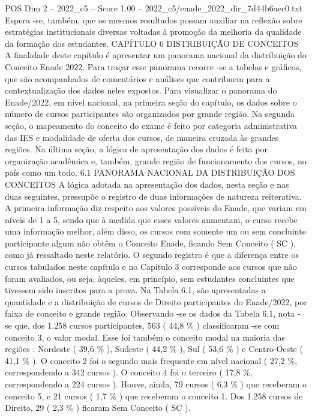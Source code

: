 \begin{textsample}{POS Dim 2 – 2022\_c5 – Score 1.00 – 2022\_c5/enade\_2022\_dir\_7d44b6aec0.txt}
Espera -se, também, que os mesmos resultados possam auxiliar na reflexão sobre estratégias institucionais diversas voltadas à promoção da melhoria da qualidade da formação dos estudantes.
CAPÍTULO 6 DISTRIBUIÇÃO DE CONCEITOS A finalidade deste capítulo é apresentar um panorama nacional da distribuição do Conceito Enade 2022.
Para traçar esse panorama recorre -se a tabelas e gráficos, que são acompanhados de comentários e análises que contribuem para a contextualização dos dados neles expostos.
Para visualizar o panorama do Enade/2022, em nível nacional, na primeira seção do capítulo, os dados sobre o número de cursos participantes são organizados por grande região.
Na segunda seção, o mapeamento do conceito do exame é feito por categoria administrativa das IES e modalidade de oferta dos cursos, de maneira cruzada às grandes regiões.
Na última seção, a lógica de apresentação dos dados é feita por organização acadêmica e, também, grande região de funcionamento dos cursos, no país como um todo. 6.1 PANORAMA NACIONAL DA DISTRIBUIÇÃO DOS CONCEITOS A lógica adotada na apresentação dos dados, nesta seção e nas duas seguintes, pressupõe o registro de duas informações de natureza reiterativa.
A primeira informação diz respeito aos valores possíveis do Enade, que variam em níveis de 1 a 5, sendo que à medida que esses valores aumentam, o curso recebe uma informação melhor, além disso, os cursos com somente um ou sem concluinte participante algum não obtêm o Conceito Enade, ficando Sem Conceito ( SC ), como já ressaltado neste relatório.
O segundo registro é que a diferença entre os cursos tabulados neste capítulo e no Capítulo 3 corresponde aos cursos que não foram avaliados, ou seja, àqueles, em princípio, sem estudantes concluintes que tivessem sido inscritos para a prova.
Na Tabela 6.1, são apresentadas a quantidade e a distribuição de cursos de Direito participantes do Enade/2022, por faixa de conceito e grande região.
Observando -se os dados da Tabela 6.1, nota -se que, dos 1.258 cursos participantes, 563 ( 44,8 \% ) classificaram -se com conceito 3, o valor modal.
Esse foi também o conceito modal na maioria das regiões : Nordeste ( 39,6 \% ), Sudeste ( 44,2 \% ), Sul ( 53,6 \% ) e Centro-Oeste ( 41,1 \% ).
O conceito 2 foi o segundo mais frequente em nível nacional ( 27,2 \%, correspondendo a 342 cursos ).
O conceito 4 foi o terceiro ( 17,8 \%, correspondendo a 224 cursos ).
Houve, ainda, 79 cursos ( 6,3 \% ) que receberam o conceito 5, e 21 cursos ( 1,7 \% ) que receberam o conceito 1.
Dos 1.258 cursos de Direito, 29 ( 2,3 \% ) ficaram Sem Conceito ( SC ).

\end{textsample}

